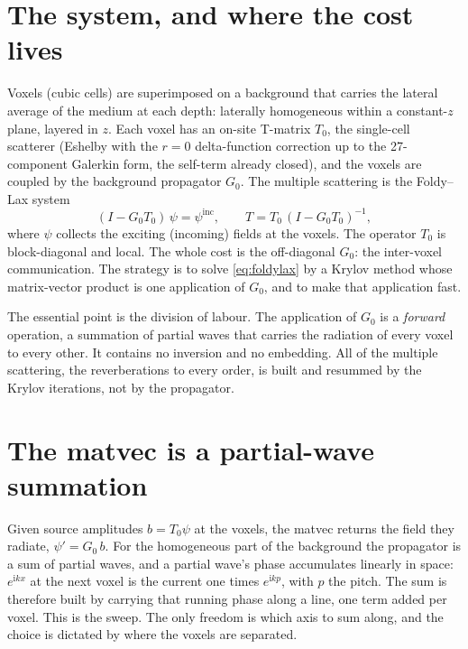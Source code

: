 \documentclass[11pt,a4paper]{article}
\newcommand{\ii}{\mathrm{i}}
\newcommand{\Tz}{T_0}
\newcommand{\Gz}{G_0}
\begin{document}
\section{The system, and where the cost lives}

Voxels (cubic cells) are superimposed on a background that carries the lateral average of the
medium at each depth: laterally homogeneous within a constant-$z$ plane, layered in $z$. Each
voxel has an on-site T-matrix $\Tz$, the single-cell scatterer (Eshelby with the $r=0$
delta-function correction up to the 27-component Galerkin form, the self-term already closed),
and the voxels are coupled by the background propagator $\Gz$. The multiple scattering is the
Foldy--Lax system \cite{Foldy1945,Lax1951,GubernatisDomanyKrumhansl1977}
\begin{equation}
\label{eq:foldylax}
(I-\Gz\Tz)\,\psi=\psi^{\mathrm{inc}},\qquad T=\Tz\,(I-\Gz\Tz)^{-1},
\end{equation}
where $\psi$ collects the exciting (incoming) fields at the voxels. The operator $\Tz$ is
block-diagonal and local. The whole cost is the off-diagonal $\Gz$: the inter-voxel
communication. The strategy is to solve \eqref{eq:foldylax} by a Krylov method whose
matrix-vector product is one application of $\Gz$, and to make that application fast.

The essential point is the division of labour. The application of $\Gz$ is a \emph{forward}
operation, a summation of partial waves that carries the radiation of every voxel to every
other. It contains no inversion and no embedding. All of the multiple scattering, the
reverberations to every order, is built and resummed by the Krylov iterations, not by the
propagator.

\section{The matvec is a partial-wave summation}

Given source amplitudes $b=\Tz\psi$ at the voxels, the matvec returns the field they radiate,
$\psi'=\Gz\,b$. For the homogeneous part of the background the propagator is a sum of partial
waves, and a partial wave's phase accumulates linearly in space: $e^{\ii k x}$ at the next
voxel is the current one times $e^{\ii k p}$, with $p$ the pitch. The sum is therefore built by
carrying that running phase along a line, one term added per voxel. This is the sweep. The only
freedom is which axis to sum along, and the choice is dictated by where the voxels are
separated.
\end{document}
